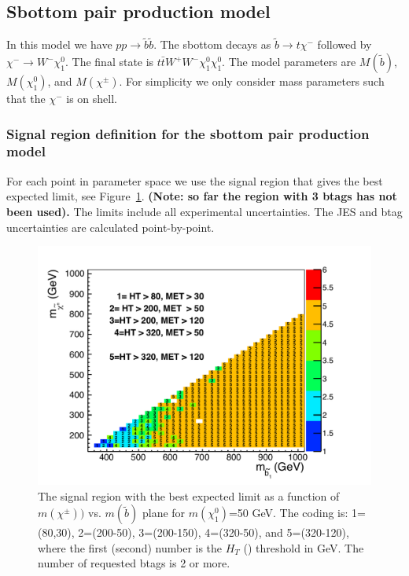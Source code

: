 

\clearpage

\subsection{Sbottom pair production model}
\label{sec:sbottompair}
In this model we have $pp \to \tilde{b}\tilde{b}$.  The sbottom decays 
as $\tilde{b} \to t\chi^{-}$ followed by $\chi^{-} \to W^- \chi_1^0$. 
The final state is $t\bar{t}W^+W^- \chi_1^0 \chi_1^0$. 
The model parameters are $M(\widetilde{b})$, $M(\chi_1^0)$, and $M(\chi^{\pm})$.
For simplicity we only consider mass parameters such that the $\chi^{-}$ is on shell.

\subsubsection{Signal region definition for the sbottom pair production model}
\label{sec:sbottompairdefinition}
For each point in parameter space we use the signal region that gives
the best expected limit, see Figure~\ref{fig:sbottomoptimize}.
{\bf (Note: so far the region with 3 btags has not been used).}
The limits include all experimental 
uncertainties.   The JES and btag uncertainties are calculated point-by-point.


\begin{figure}[htb]
\begin{center}
\includegraphics[width=0.5\linewidth]{figs/sbottom_regions.pdf}
\caption{The signal region with the best expected limit as a function of 
$m(\chi^{\pm}))$ vs. $m(\widetilde{b})$ plane for $m(\chi^0_1)$=50 GeV.
The coding is: 1=(80,30),
2=(200-50), 3=(200-150), 4=(320-50), and 5=(320-120), where
the first (second) number is the $H_T$ (\met) threshold in GeV. The number
of requested btags is 2 or more.
\label{fig:sbottomoptimize}}
\end{center}
\end{figure}


